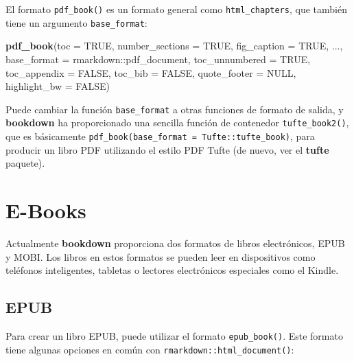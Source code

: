\documentclass[12pt,]{krantz}
\makeatletter
\newenvironment{Shaded}{\begin{snugshade}}{\end{snugshade}}
\newcommand{\KeywordTok}[1]{\textcolor[rgb]{0.13,0.29,0.53}{\textbf{{#1}}}}
\newcommand{\DataTypeTok}[1]{\textcolor[rgb]{0.13,0.29,0.53}{{#1}}}
\newcommand{\OtherTok}[1]{\textcolor[rgb]{0.56,0.35,0.01}{{#1}}}
\newcommand{\NormalTok}[1]{{#1}}
\newenvironment{kframe}{%
\medskip{}
\setlength{\fboxsep}{.8em}
 \def\at@end@of@kframe{}%
 \ifinner\ifhmode%
  \def\at@end@of@kframe{\end{minipage}}%
  \begin{minipage}{\columnwidth}%
 \fi\fi%
 \def\FrameCommand##1{\hskip\@totalleftmargin \hskip-\fboxsep
 \colorbox{shadecolor}{##1}\hskip-\fboxsep
     \hskip-\linewidth \hskip-\@totalleftmargin \hskip\columnwidth}%
 \MakeFramed {\advance\hsize-\width
   \@totalleftmargin\z@ \linewidth\hsize
   \@setminipage}}%
 {\par\unskip\endMakeFramed%
 \at@end@of@kframe}
\renewenvironment{Shaded}{\begin{kframe}}{\end{kframe}}
\theoremstyle{definition}
\theoremstyle{definition}
\theoremstyle{remark}
\makeatother
\begin{document}
El formato \texttt{pdf\_book()} es un formato general como
\texttt{html\_chapters}, que también tiene un argumento
\texttt{base\_format}:

\begin{Shaded}
\begin{Highlighting}[]
\KeywordTok{pdf_book}\NormalTok{(}\DataTypeTok{toc =} \OtherTok{TRUE}\NormalTok{, }\DataTypeTok{number_sections =} \OtherTok{TRUE}\NormalTok{, }\DataTypeTok{fig_caption =} \OtherTok{TRUE}\NormalTok{, }
  \NormalTok{..., }\DataTypeTok{base_format =} \NormalTok{rmarkdown::pdf_document, }\DataTypeTok{toc_unnumbered =} \OtherTok{TRUE}\NormalTok{, }
  \DataTypeTok{toc_appendix =} \OtherTok{FALSE}\NormalTok{, }\DataTypeTok{toc_bib =} \OtherTok{FALSE}\NormalTok{, }\DataTypeTok{quote_footer =} \OtherTok{NULL}\NormalTok{, }
  \DataTypeTok{highlight_bw =} \OtherTok{FALSE}\NormalTok{)}
\end{Highlighting}
\end{Shaded}

Puede cambiar la función \texttt{base\_format} a otras funciones de
formato de salida, y \textbf{bookdown} ha proporcionado una sencilla
función de contenedor \texttt{tufte\_book2()}, que es básicamente
\texttt{pdf\_book(base\_format\ =\ Tufte::tufte\_book)}, para producir
un libro PDF utilizando el estilo PDF Tufte (de nuevo, ver el
\textbf{tufte} paquete).

\section{E-Books}\label{e-books}

Actualmente \textbf{bookdown} proporciona dos formatos de libros
electrónicos, EPUB y MOBI. Los libros en estos formatos se pueden leer
en dispositivos como teléfonos inteligentes, tabletas o lectores
electrónicos especiales como el Kindle.

\subsection{EPUB}\label{epub}

Para crear un libro EPUB, puede utilizar el formato
\texttt{epub\_book()}. Este formato tiene algunas opciones en común con
\texttt{rmarkdown::html\_document()}:
\end{document}
